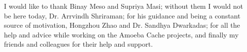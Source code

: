 
%
%


I would like to thank Binay Meso and Supriya Masi; without them I would not be here today, Dr. Arrvindh Shriraman; for his guidance and being a constant source of motivation, Hongzhou Zhao and  Dr. Sandhya Dwarkadas; for all the help and advice while working on the Amoeba Cache projects, and finally my friends and colleagues for their help and support.
























